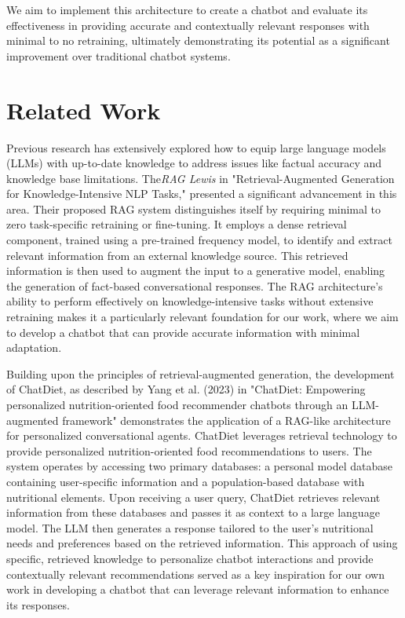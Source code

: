 \documentclass{article}
\begin{document}
We aim to implement this architecture to create a chatbot and evaluate its effectiveness in providing accurate and contextually relevant responses with minimal to no retraining, ultimately demonstrating its potential as a significant improvement over traditional chatbot systems.

\section{Related Work}
    Previous research has extensively explored how to equip large language models (LLMs) with up-to-date knowledge to address issues like factual accuracy and knowledge base limitations. The\textit{RAG Lewis} \cite{RAG_lewis} in "Retrieval-Augmented Generation for Knowledge-Intensive NLP Tasks," presented a significant advancement in this area. Their proposed RAG system distinguishes itself by requiring minimal to zero task-specific retraining or fine-tuning. It employs a dense retrieval component, trained using a pre-trained frequency model, to identify and extract relevant information from an external knowledge source. This retrieved information is then used to augment the input to a generative model, enabling the generation of fact-based conversational responses. The RAG architecture's ability to perform effectively on knowledge-intensive tasks without extensive retraining makes it a particularly relevant foundation for our work, where we aim to develop a chatbot that can provide accurate information with minimal adaptation.
    
   Building upon the principles of retrieval-augmented generation, the development of ChatDiet, as described by Yang et al. (2023) in "ChatDiet: Empowering personalized nutrition-oriented food recommender chatbots through an LLM-augmented framework"\cite{ChatDiet} demonstrates the application of a RAG-like architecture for personalized conversational agents. ChatDiet leverages retrieval technology to provide personalized nutrition-oriented food recommendations to users. The system operates by accessing two primary databases: a personal model database containing user-specific information and a population-based database with nutritional elements. Upon receiving a user query, ChatDiet retrieves relevant information from these databases and passes it as context to a large language model. The LLM then generates a response tailored to the user's nutritional needs and preferences based on the retrieved information. This approach of using specific, retrieved knowledge to personalize chatbot interactions and provide contextually relevant recommendations served as a key inspiration for our own work in developing a chatbot that can leverage relevant information to enhance its responses.
\end{document}
